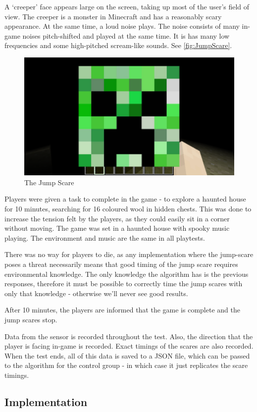 \documentclass[12pt,a4paper]{article}\usepackage[]{graphicx}\usepackage[]{color}
\begin{document}
A `creeper' face appears large on the screen, taking up most of the user's field of view. The creeper is a monster in Minecraft and has a reasonably scary appearance. At the same time, a loud noise plays. The noise consists of many in-game noises pitch-shifted and played at the same time. It is has many low frequencies and some high-pitched scream-like sounds. See \vref{fig:JumpScare}.

\begin{figure}[htb]
	\centering
	\includegraphics[width=0.5\linewidth]{images/scare.png}
	\caption{The Jump Scare}
	\label{fig:JumpScare}
\end{figure}


Players were given a task to complete in the game - to explore a haunted house for 10 minutes, searching for 16 coloured wool in hidden chests.
This was done to increase the tension felt by the players, as they could easily sit in a corner without moving.
The game was set in a haunted house with spooky music playing. The environment and music are the same in all playtests.

There was no way for players to die, as any implementation where the jump-scare poses a threat necessarily means that good timing of the jump scare requires environmental knowledge.
The only knowledge the algorithm has is the previous responses, therefore it must be possible to correctly time the jump scares with only that knowledge - otherwise we'll never see good results.

After 10 minutes, the players are informed that the game is complete and the jump scares stop.

Data from the sensor is recorded throughout the test.
Also, the direction that the player is facing in-game is recorded.
Exact timings of the scares are also recorded.
When the test ends, all of this data is saved to a JSON file, which can be passed to the algorithm for the control group - in which case it just replicates the scare timings.

\subsection{Implementation}
\end{document}

